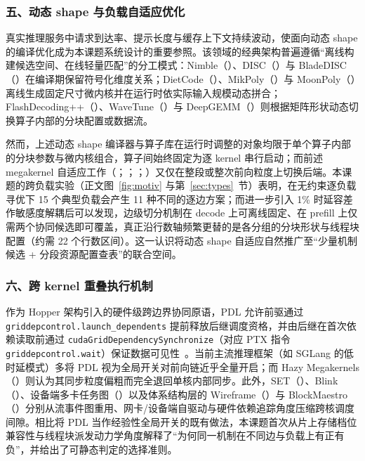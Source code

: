 \subsubsection*{五、动态 shape 与负载自适应优化}

真实推理服务中请求到达率、提示长度与缓存上下文持续波动，使面向动态 shape 的编译优化成为本课题系统设计的重要参照。该领域的经典架构普遍遵循“离线构建候选空间、在线轻量匹配”的分工模式：Nimble（）、DISC（）与 BladeDISC（）在编译期保留符号化维度关系；DietCode（）、MikPoly（）与 MoonPoly（）离线生成固定尺寸微内核并在运行时依实际输入规模动态拼合；FlashDecoding++（）、WaveTune（）与 DeepGEMM（）则根据矩阵形状动态切换算子内部的分块配置或数据流。

然而，上述动态 shape 编译器与算子库在运行时调整的对象均限于单个算子内部的分块参数与微内核组合，算子间始终固定为逐 kernel 串行启动；而前述 megakernel 自适应工作（；；；）又仅在整段或整次前向粒度上切换后端。本课题的跨负载实验（正文图~\ref{fig:motiv} 与第~\ref{sec:types}~节）表明，在无约束逐负载寻优下 15 个典型负载会产生 11 种不同的逐边方案；而进一步引入 1\% 时延容差作敏感度解耦后可以发现，边级切分机制在 decode 上可离线固定、在 prefill 上仅需两个协同候选即可覆盖，真正沿行数轴频繁更替的是各分组的分块形状与线程块配置（约需 22 个行数区间）。这一认识将动态 shape 自适应自然推广至“少量机制候选 + 分段资源配置查表”的联合空间。

\subsubsection*{六、跨 kernel 重叠执行机制}

作为 Hopper 架构引入的硬件级跨边界协同原语，PDL 允许前驱通过 \texttt{griddepcontrol.launch\_dependents} 提前释放后继调度资格，并由后继在首次依赖读取前通过 \texttt{cudaGridDependencySynchronize}（对应 PTX 指令 \texttt{griddepcontrol.wait}）保证数据可见性~\pPDL。当前主流推理框架（如 SGLang 的低时延模式）多将 PDL 视为全局开关对前向链近乎全量开启；而 Hazy Megakernels（）则认为其同步粒度偏粗而完全退回单核内部同步。此外，SET（）、Blink（）、设备端多卡任务图（）以及体系结构层的 Wireframe（）与 BlockMaestro（）分别从流事件图重用、网卡/设备端自驱动与硬件依赖追踪角度压缩跨核调度间隙。相比将 PDL 当作经验性全局开关的既有做法，本课题首次从片上存储档位兼容性与线程块派发动力学角度解释了“为何同一机制在不同边与负载上有正有负”，并给出了可静态判定的选择准则。

